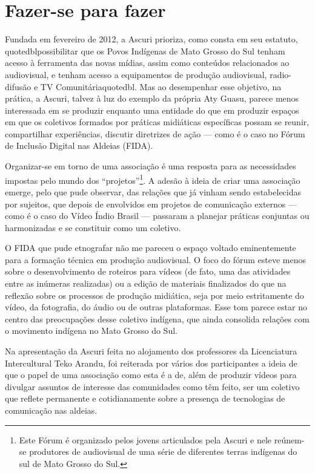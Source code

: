 \section{Fazer-se para fazer}

Fundada em fevereiro de 2012, a Ascuri prioriza, como consta em seu
estatuto, {quotedbl}possibilitar que os Povos Indígenas de Mato
Grosso do Sul tenham acesso à ferramenta das novas mídias, assim como
conteúdos relacionados ao audiovisual, e tenham acesso a equipamentos
de produção audiovisual, radio-difusão e TV Comunitária{quotedbl}.
Mas ao desempenhar esse objetivo, na prática, a Ascuri, talvez à luz do
exemplo da própria Aty Guasu, parece menos interessada em se produzir
enquanto uma entidade do que em produzir espaços em que os coletivos
formados por práticas midiáticas específicas possam se reunir,
compartilhar experiências, discutir diretrizes de ação — como é o caso
no Fórum de Inclusão Digital nas Aldeias (FIDA).

Organizar-se em torno de uma associação é uma resposta para as
necessidades impostas pelo mundo dos ``projetos''\footnote{Este Fórum é
organizado pelos jovens articulados pela Ascuri e nele reúnem-se
produtores de audiovisual de uma série de diferentes terras indígenas
do sul de Mato Grosso do Sul. }. A adesão à ideia de criar uma
associação emerge, pelo que pude observar, das relações que já vinham
sendo estabelecidas por sujeitos, que depois de envolvidos em projetos
de comunicação externos — como é o caso do Vídeo Índio Brasil —
passaram a planejar práticas conjuntas ou harmonizadas e se constituir
como um coletivo.

O FIDA que pude etnografar não me pareceu o espaço voltado eminentemente
para a formação técnica em produção audiovisual. O foco do fórum esteve
menos sobre o desenvolvimento de roteiros para vídeos (de fato, uma das
atividades entre as inúmeras realizadas) ou a edição de materiais
finalizados do que na reflexão sobre os processos de produção
midiática, seja por meio estritamente do vídeo, da fotografia, do áudio
ou de outras plataformas. Esse tom parece estar no centro das
preocupações desse coletivo indígena, que ainda consolida relações com
o movimento indígena no Mato Grosso do Sul.

Na apresentação da Ascuri feita no alojamento dos professores da
Licenciatura Intercultural Teko Arandu, foi reiterada por vários dos
participantes a ideia de que o papel de uma associação como esta é a
de, além de produzir vídeos para divulgar assuntos de interesse das
comunidades como têm feito, ser um coletivo que reflete permanente e cotidianamente
sobre a presença de tecnologias de comunicação nas aldeias.

